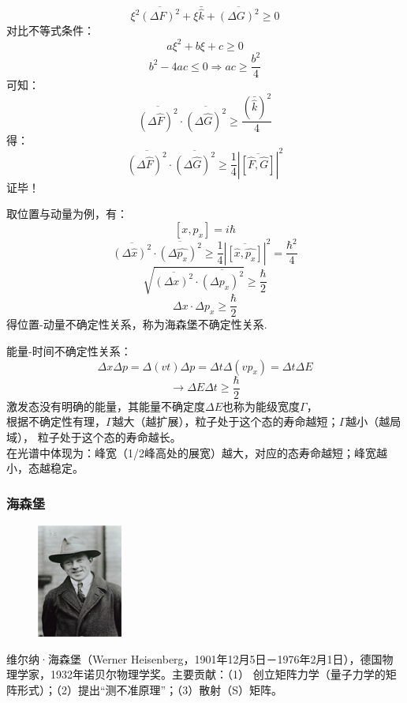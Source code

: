 \begin{frame} 
    \[\xi^{2} \overline{(\Delta F)^{2}}+\xi \bar{\hat{k}}+\overline{(\Delta G)^{2}} \geq  0\]  
    对比不等式条件：
    $$
    a \xi^{2}+b \xi+c \geq 0
    $$
    $$
    b^{2}-4 a c \leq 0 \Rightarrow a c \geq \frac{b^{2}}{4}
    $$
    可知： 
    $$
    \overline{(\Delta \hat{F})^{2}} \cdot \overline{(\Delta \hat{G})^{2}} \geq \frac{(\bar{\hat{k}})^{2}}{4}
    $$
    得： 
    $$
    \overline{(\Delta \hat{F})^{2}} \cdot \overline{(\Delta \hat{G})^{2}} \geq \frac{1}{4}|\overline{[\hat{F}, \hat{G}]}|^{2}
    $$
    证毕！
\end{frame} 

\begin{frame}
取位置与动量为例，有：
$$ [x,p_x]=i\hbar $$
$$
\overline{(\Delta \hat{x})^{2}} \cdot \overline{(\Delta \hat{p_x})^{2}} 
\geq \frac{1}{4}|\overline{[\hat{x}, \hat{p_x}]}|^{2}=\frac{\hbar^2}{4}
$$
$$
\sqrt{\overline{(\Delta x)^{2}} \cdot \overline{(\Delta p_x)^{2}}} 
\geq \frac{\hbar}{2}
$$
$$  
\Delta x \cdot \Delta p_x 
\geq \frac{\hbar}{2}
$$ 
得位置-动量不确定性关系，称为海森堡不确定性关系.
\end{frame}

\begin{frame}
    能量-时间不确定性关系：
    \[\Delta x \Delta p = \Delta (vt)  \Delta p = \Delta t  \Delta (vp_x)= \Delta t  \Delta E \]
    \[\to \Delta E \Delta t \geq \frac{\hbar}{2}  \]
    激发态没有明确的能量，其能量不确定度$\Delta E$也称为能级宽度$\Gamma$，\\
    根据不确定性有理，$\Gamma$越大（越扩展），粒子处于这个态的寿命越短；$\Gamma$越小（越局域），
    粒子处于这个态的寿命越长。\\
    在光谱中体现为：峰宽（1/2峰高处的展宽）越大，对应的态寿命越短；峰宽越小，态越稳定。 
\end{frame}

\begin{frame}
    \frametitle{海森堡}
    \begin{figure} %
        \includegraphics[width=0.25\textwidth]{figs/hesb.png}   
    \end{figure}
    维尔纳·海森堡（Werner Heisenberg，1901年12月5日－1976年2月1日），德国物理学家，1932年诺贝尔物理学奖。主要贡献：（1） 创立矩阵力学（量子力学的矩阵形式）；（2）提出“测不准原理”；（3）散射（S）矩阵。  
\end{frame}

